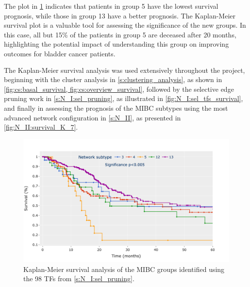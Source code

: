 The plot in \cref{fig:lit:surival_eg} indicates that patients in group 5 have the lowest survival prognosis, while those in group 13 have a better prognosis. The Kaplan-Meier survival plot is a valuable tool for assessing the significance of the new groups. In this case, all but 15\% of the patients in group 5 are deceased after 20 months, highlighting the potential impact of understanding this group on improving outcomes for bladder cancer patients.

The Kaplan-Meier survival analysis was used extensively throughout the project, beginning with the cluster analysis in \cref{s:clustering_analysis}, as shown in \cref{fig:cs:basal_survival, fig:cs:overview_survival}, followed by the selective edge pruning work in \cref{s:N_I:sel_pruning}, as illustrated in \cref{fig:N_I:sel_tfs_survival}, and finally in assessing the prognosis of the MIBC subtypes using the most advanced network configuration in \cref{s:N_II}, as presented in \cref{fig:N_II:survival_K_7}.


\begin{figure}[!htb]
    \centering
    \includegraphics[width=1.0\textwidth,height=1.0\textheight,keepaspectratio]
    {Sections/Network_I/Resources/selective_pruning/survival_sel_tfs_cs.png}
    \caption{Kaplan-Meier survival analysis of the MIBC groups identified using the 98 TFs from \cref{s:N_I:sel_pruning}.}
    \label{fig:lit:surival_eg}
\end{figure}

